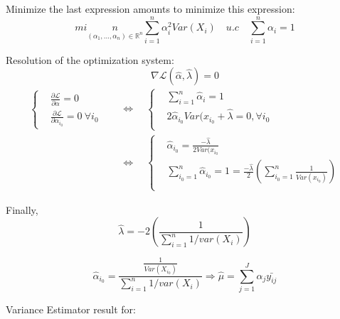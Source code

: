 \documentclass[unknownkeysallowed]{beamer}
\begin{document}
\begin{frame}
Minimize the last expression amounts to minimize this expression: 
    $$ min\limits_{(\alpha_{1},...,\alpha_{n})\in \mathbb{R}^{n}} \sum\limits_{i=1}^{n}\alpha_{i}^{2}Var(X_{i}) \quad u.c \quad  \sum\limits_{i=1}^{n}\alpha_{i}=1 $$
\begin{itemize}\setlength{\itemsep}{5pt}
\end{itemize}
Resolution of the optimization system:
\[\nabla \mathcal{L}(\hat\alpha,\hat\lambda)=0\]
\[
\begin{aligned}
\begin{cases}
&  \frac{\partial \mathcal{L}}{\partial \alpha}=0 \\
&  \frac{\partial \mathcal{L}}{\partial \alpha_{i_0}}=0\ \forall i_0 
\end{cases}
\quad&\Longleftrightarrow\quad
\begin{cases}
&  \sum\limits_{i=1}^{n}\hat{\alpha}_i=1 \\
&  2\hat\alpha_{i_0}Var(x_{i_0} + \hat\lambda =0, \forall{i_0}  \\
\end{cases}\\
& \Longleftrightarrow\quad
\begin{cases}
&  \hat\alpha_{i_0}=\frac{-\hat\lambda}{2Var(x_{i_0}} \\
& \sum\limits_{i_{0}=1}^{n}\hat{\alpha}_i_{0}=1=\frac{-\hat\lambda}{2}(\sum_{i_{0}=1}^{n}\frac{1}{Var(x_{i_0})}) \\

\end{cases}
\end{aligned}
\]
\end{frame}
\begin{frame}
    Finally, $$ \hat \lambda = -2(\frac{1}{\sum_{i=1}^{n}1/var(X_{i})})$$
    
     $$\hat\alpha_{i_0}=\frac{\frac{1}{Var(X_i_0)}}{\sum_{i=1}^{n}1/var(X_{i})} 
    \Longrightarrow \hat\mu = \sum_{j=1}^{J}\alpha_{j}\bar{y_{ij}}$$
\end{frame}
\begin{frame}{Variance Estimator}
result for:
\begin{itemize}\setlength{\itemsep}{5pt}
\end{itemize}
\end{frame}
\end{document}

